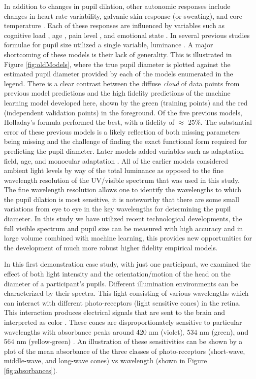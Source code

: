 \documentclass[10pt]{article}
\begin{document}
 In addition to changes in pupil dilation, other autonomic responses include changes in heart rate variability, galvanic skin response (or sweating), and core temperature  \cite{HRVreview, GSR, tempLoad}. Each of these responses are influenced by variables such as cognitive load \cite{PupilLoad1,PupilLoad2,PupilLoad3,PupilLoad4}, age \cite{PupilAge}, pain level \cite{PupilPain}, and emotional state \cite{PupilEmotion}. In several previous studies formulae for pupil size utilized a single variable, luminance \cite{HolladayPupil1vModel, CrawfordPupil1vModel, MoonPupil1vModel, deGrootPupil1vModel, BlackiePupil1vModel}. A major shortcoming of these models is their lack of generality. This is illustrated in Figure \ref{fig:oldModels}, where the true pupil diameter is plotted against the estimated pupil diameter provided by each of the models enumerated in the legend. There is a clear contrast between the diffuse \textit{cloud} of data points from previous model predictions and the high fidelity predictions of the machine learning model developed here, shown by the green (training points) and the red (independent validation points) in the foreground. Of the five previous models, Holladay's formula \cite{HolladayPupil1vModel} performed the best, with a fidelity of $\approx$ 25\%. The substantial error of these previous models is a likely reflection of both missing parameters being missing and the challenge of finding the exact functional form required for predicting the pupil diameter. Later models added variables such as adaptation field, age, and monocular adaptation \cite{StanleyPupilMvModel,BartenPupilMvModel,PupilModels}. All of the earlier models considered ambient light levels by way of the total luminance as opposed to the fine wavelength resolution of the UV/visible spectrum that was used in this study. The fine wavelength resolution allows one to identify the wavelengths to which the pupil dilation is most sensitive, it is noteworthy that there are some small variations from eye to eye in the key wavelengths for determining the pupil diameter. In this study we have utilized recent technological developments, the full visible spectrum and pupil size can be measured with high accuracy and in large volume combined with machine learning, this provides new opportunities for the development of much more robust higher fidelity empirical models.

In this first demonstration case study, with just one participant, we examined the effect of both light intensity and the orientation/motion of the head on the diameter of a participant's pupils. Different illumination environments can be characterized by their spectra. This light consisting of various wavelengths which can interact with different photo-receptors (light sensitive cones) in the retina. This interaction produces electrical signals that are sent to the brain and interpreted as color \cite{LightColor}. These cones are disproportionately sensitive to particular wavelengths with absorbance peaks around 420 nm (violet), 534 nm (green), and 564 nm (yellow-green) \cite{BowmakerCones}. An illustration of these sensitivities can be shown by a plot of the mean absorbance of the three classes of photo-receptors (short-wave, middle-wave, and long-wave cones) vs wavelength (shown in Figure \ref{fig:absorbances}).
\end{document}
